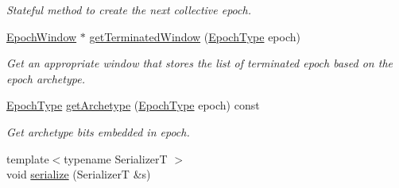 \begin{DoxyCompactItemize}
\begin{DoxyCompactList}\small\item\em Stateful method to create the next collective epoch. \end{DoxyCompactList}\item 
\hyperlink{structvt_1_1epoch_1_1_epoch_window}{Epoch\+Window} $\ast$ \hyperlink{structvt_1_1epoch_1_1_epoch_manip_a2ed00df099793bd9f9452203ba8ba571}{get\+Terminated\+Window} (\hyperlink{structvt_1_1epoch_1_1_epoch_type}{Epoch\+Type} epoch)
\begin{DoxyCompactList}\small\item\em Get an appropriate window that stores the list of terminated epoch based on the epoch archetype. \end{DoxyCompactList}\item 
\hyperlink{structvt_1_1epoch_1_1_epoch_type}{Epoch\+Type} \hyperlink{structvt_1_1epoch_1_1_epoch_manip_ac1f50556319696bba8695a013f49abcf}{get\+Archetype} (\hyperlink{structvt_1_1epoch_1_1_epoch_type}{Epoch\+Type} epoch) const
\begin{DoxyCompactList}\small\item\em Get archetype bits embedded in epoch. \end{DoxyCompactList}\item 
{\footnotesize template$<$typename SerializerT $>$ }\\void \hyperlink{structvt_1_1epoch_1_1_epoch_manip_a5a502343c972a5efc975943ce8510d1d}{serialize} (SerializerT \&s)
\end{DoxyCompactItemize}
